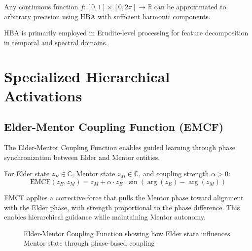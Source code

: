 \begin{theorem}
Any continuous function $f: [0,1] \times [0,2\pi] \to \mathbb{R}$ can be approximated to arbitrary precision using HBA with sufficient harmonic components.
\end{theorem}

HBA is primarily employed in Erudite-level processing for feature decomposition in temporal and spectral domains.

\section{Specialized Hierarchical Activations}

\subsection{Elder-Mentor Coupling Function (EMCF)}

The Elder-Mentor Coupling Function enables guided learning through phase synchronization between Elder and Mentor entities.

\begin{definition}
For Elder state $z_E \in \mathbb{C}$, Mentor state $z_M \in \mathbb{C}$, and coupling strength $\alpha > 0$:
\begin{equation}
\text{EMCF}(z_E, z_M) = z_M + \alpha \cdot z_E \cdot \sin(\arg(z_E) - \arg(z_M))
\end{equation}
\end{definition}

EMCF applies a corrective force that pulls the Mentor phase toward alignment with the Elder phase, with strength proportional to the phase difference. This enables hierarchical guidance while maintaining Mentor autonomy.

\begin{figure}[h]
\centering
{}
\caption{Elder-Mentor Coupling Function showing how Elder state influences Mentor state through phase-based coupling}
\end{figure}

